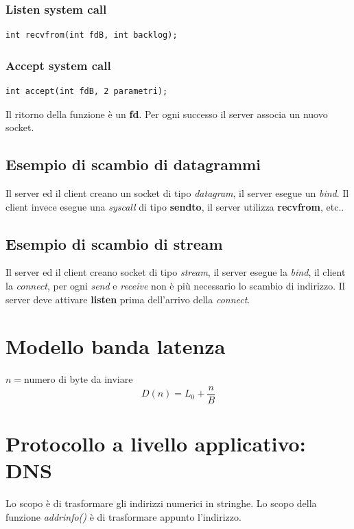 \subsubsection{Listen system call}
\begin{lstlisting}[caption=Esempio di syscall listen]
int recvfrom(int fdB, int backlog);
\end{lstlisting}

\subsubsection{Accept system call}
\begin{lstlisting}[caption=Esempio di syscall accept]
int accept(int fdB, 2 parametri);
\end{lstlisting}
Il ritorno della funzione è un \textbf{fd}.
Per ogni successo il server associa un nuovo socket.

\subsection{Esempio di scambio di datagrammi}
Il server ed il client creano un socket di tipo \emph{datagram}, il server
esegue un \emph{bind}.
Il client invece esegue una \emph{syscall} di tipo \textbf{sendto}, il server
utilizza \textbf{recvfrom}, etc..

\subsection{Esempio di scambio di stream}
Il server ed il client creano socket di tipo \emph{stream}, il server esegue
la \emph{bind}, il client la \emph{connect}, per ogni \emph{send} e
\emph{receive} non è più necessario lo scambio di indirizzo.
Il server deve attivare \textbf{listen} prima dell'arrivo della \emph{connect}.

\section{Modello banda latenza}
$n=$numero di byte da inviare
\[
  D(n)=L_0+\dfrac{n}{B}
\]

\section{Protocollo a livello applicativo: DNS}
Lo scopo è di trasformare gli indirizzi numerici in stringhe.
Lo scopo della funzione \emph{addrinfo()} è di trasformare appunto l'indirizzo.

